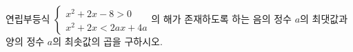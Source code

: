 연립부등식 $\begin{cases} x^2+2x-8>0 \\ x^2+2x<2ax+4a \end{cases}$의 해가 존재하도록 하는 음의 정수 $a$의 최댓값과 양의 정수 $a$의 최솟값의 곱을 구하시오.
